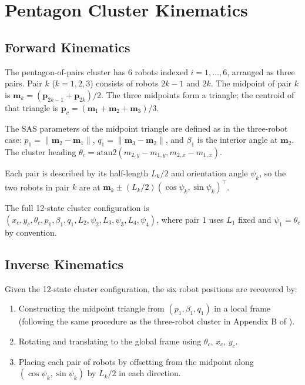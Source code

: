\documentclass[lettersize,journal]{IEEEtran}
\begin{document}
\section{Pentagon Cluster Kinematics}
\label{app:kinematics}

\subsection{Forward Kinematics}

The pentagon-of-pairs cluster has 6 robots indexed $i = 1, \ldots, 6$, arranged
as three pairs. Pair $k$ ($k = 1, 2, 3$) consists of robots $2k-1$ and $2k$.
The midpoint of pair $k$ is $\mathbf{m}_k = (\mathbf{p}_{2k-1} +
\mathbf{p}_{2k})/2$. The three midpoints form a triangle; the centroid of that
triangle is $\mathbf{p}_c = (\mathbf{m}_1 + \mathbf{m}_2 + \mathbf{m}_3)/3$.

The SAS parameters of the midpoint triangle are defined as in the three-robot
case: $p_1 = \|\mathbf{m}_2 - \mathbf{m}_1\|$, $q_1 = \|\mathbf{m}_3 -
\mathbf{m}_2\|$, and $\beta_1$ is the interior angle at $\mathbf{m}_2$.
The cluster heading $\theta_c = \text{atan2}(m_{2,y} - m_{1,y},
m_{2,x} - m_{1,x})$.

Each pair is described by its half-length $L_k/2$ and orientation angle
$\psi_k$, so the two robots in pair $k$ are at $\mathbf{m}_k \pm (L_k/2)
(\cos\psi_k, \sin\psi_k)^\top$.

The full 12-state cluster configuration is
$(x_c, y_c, \theta_c, p_1, \beta_1, q_1, L_2, \psi_2, L_3, \psi_3,
L_4, \psi_4)$, where pair 1 uses $L_1$ fixed and $\psi_1 = \theta_c$ by
convention.

\subsection{Inverse Kinematics}

Given the 12-state cluster configuration, the six robot positions are recovered
by:
\begin{enumerate}
    \item Constructing the midpoint triangle from $(p_1, \beta_1, q_1)$ in
          a local frame (following the same procedure as the three-robot
          cluster in Appendix B of \cite{14}).
    \item Rotating and translating to the global frame using $\theta_c$,
          $x_c$, $y_c$.
    \item Placing each pair of robots by offsetting from the midpoint along
          $(\cos\psi_k, \sin\psi_k)$ by $L_k/2$ in each direction.
\end{enumerate}
\end{document}
